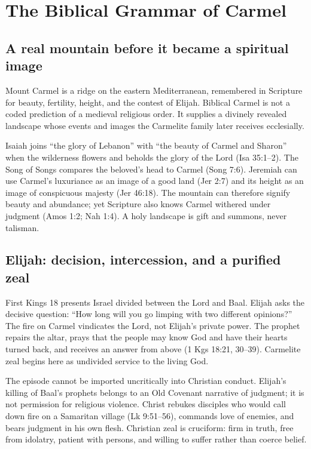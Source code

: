 \section{The Biblical Grammar of Carmel}

\subsection{A real mountain before it became a spiritual image}

Mount Carmel is a ridge on the eastern Mediterranean, remembered in Scripture for beauty, fertility, height, and the contest of Elijah. Biblical Carmel is not a coded prediction of a medieval religious order. It supplies a divinely revealed landscape whose events and images the Carmelite family later receives ecclesially.

Isaiah joins ``the glory of Lebanon'' with ``the beauty of Carmel and Sharon'' when the wilderness flowers and beholds the glory of the Lord (Isa 35:1--2). The Song of Songs compares the beloved's head to Carmel (Song 7:6). Jeremiah can use Carmel's luxuriance as an image of a good land (Jer 2:7) and its height as an image of conspicuous majesty (Jer 46:18). The mountain can therefore signify beauty and abundance; yet Scripture also knows Carmel withered under judgment (Amos 1:2; Nah 1:4). A holy landscape is gift and summons, never talisman.

\subsection{Elijah: decision, intercession, and a purified zeal}

First Kings 18 presents Israel divided between the Lord and Baal. Elijah asks the decisive question: ``How long will you go limping with two different opinions?'' The fire on Carmel vindicates the Lord, not Elijah's private power. The prophet repairs the altar, prays that the people may know God and have their hearts turned back, and receives an answer from above (1 Kgs 18:21, 30--39). Carmelite zeal begins here as undivided service to the living God.

The episode cannot be imported uncritically into Christian conduct. Elijah's killing of Baal's prophets belongs to an Old Covenant narrative of judgment; it is not permission for religious violence. Christ rebukes disciples who would call down fire on a Samaritan village (Lk 9:51--56), commands love of enemies, and bears judgment in his own flesh. Christian zeal is cruciform: firm in truth, free from idolatry, patient with persons, and willing to suffer rather than coerce belief.

